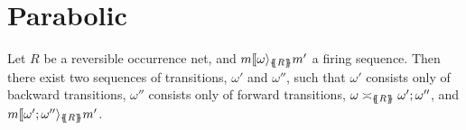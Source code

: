 %


\chapter{Parabolic}\label{chap:parabolic}

\begin{lemma}
  \label{lemma:parabolic}
  \leanok
  Let $R$ be a reversible occurrence net, and $m \llbracket {\omega} \rangle_{\{\!\!\{ R\}\!\!\}} m'$ a
  firing sequence. Then there exist two sequences of transitions, $\omega'$ and
  $\omega''$, such that $\omega'$ consists only of backward transitions, $\omega''$
  consists only of forward transitions, $\omega \asymp_{\{\!\!\{ R \}\!\!\}} \omega'; \omega''$,
  and $m \llbracket{\omega'; \omega''}\rangle_{\{\!\!\{ R \}\!\!\}} m'$.
\end{lemma}
